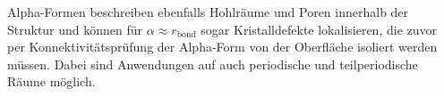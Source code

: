 Alpha-Formen beschreiben ebenfalls Hohlräume und Poren innerhalb der Struktur und können für $\alpha \approx r_\text{bond}$ sogar Kristalldefekte lokalisieren, die zuvor per Konnektivitätsprüfung der Alpha-Form  von der Oberfläche isoliert werden müssen.
Dabei sind Anwendungen auf auch periodische und teilperiodische Räume möglich.




